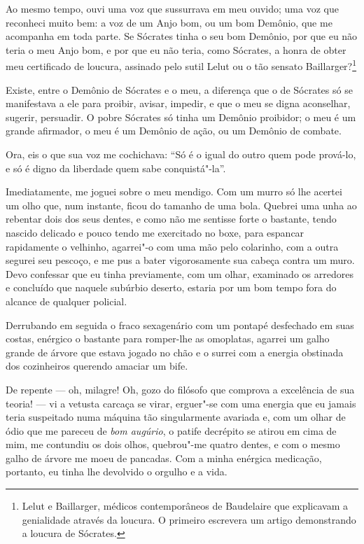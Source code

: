 Ao mesmo tempo, ouvi uma voz que sussurrava em meu ouvido; uma voz que
reconheci muito bem: a voz de um Anjo bom, ou um bom Demônio, que me
acompanha em toda parte. Se Sócrates tinha o seu bom Demônio, por que
eu não teria o meu Anjo bom, e por que eu não teria, como
Sócrates, a honra de obter meu certificado de loucura, assinado pelo
sutil Lelut ou o tão sensato Baillarger?\footnote{  Lelut e Baillarger, 
médicos contemporâneos de Baudelaire que explicavam a 
genialidade através da loucura. O primeiro escrevera um
artigo demonstrando a loucura de Sócrates.}

Existe, entre o Demônio de Sócrates e o meu, a diferença que o de Sócrates
só se manifestava a ele para proibir, avisar, impedir, e que o meu se
digna aconselhar, sugerir, persuadir. O pobre Sócrates só tinha um
Demônio proibidor; o meu é um grande afirmador, o meu é um Demônio de
ação, ou um Demônio de combate.

Ora, eis o que sua voz me cochichava: “Só é o igual do
outro quem pode prová-lo, e só é digno da liberdade quem sabe
conquistá"-la''.

Imediatamente, me joguei sobre o meu mendigo. Com um murro só lhe acertei
um olho que, num instante, ficou do tamanho de uma bola. Quebrei
uma unha ao rebentar dois dos seus dentes, e como não me sentisse forte o
bastante, tendo nascido delicado e pouco tendo me exercitado no boxe,
para espancar rapidamente o velhinho, agarrei"-o com uma mão pelo
colarinho, com a outra segurei seu pescoço, e me pus a bater
vigorosamente sua cabeça contra um muro. Devo confessar que eu tinha
previamente, com um olhar, examinado os arredores e concluído que
naquele subúrbio deserto, estaria por um bom tempo fora do
alcance de qualquer policial.

Derrubando em seguida o fraco sexagenário com um pontapé desfechado em suas costas, enérgico o
bastante para romper-lhe as omoplatas, agarrei um galho grande de árvore que estava jogado no
chão e o surrei com a energia obstinada dos cozinheiros querendo
amaciar um bife.

De repente --- oh, milagre! Oh, gozo do filósofo que comprova a
excelência de sua teoria! --- vi a vetusta carcaça se virar,
erguer"-se com uma energia que eu jamais teria suspeitado numa máquina
tão singularmente avariada e, com um olhar de ódio que me pareceu de
\textit{bom augúrio}, o patife decrépito se atirou em cima de mim, me contundiu
os dois olhos, quebrou"-me quatro dentes, e com o mesmo galho de
árvore me moeu de pancadas. Com a minha enérgica medicação, portanto, eu 
tinha lhe devolvido o orgulho e a vida.

